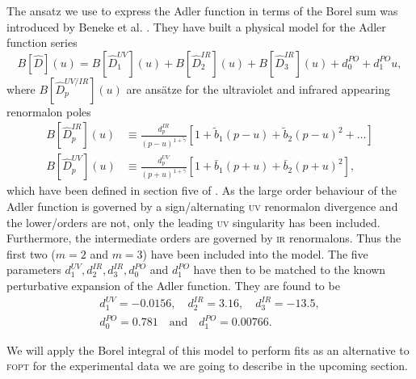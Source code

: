 \documentclass[../../index.tex]{subfiles}
\begin{document}
The ansatz we use to express the Adler function in terms of the Borel sum was
introduced by Beneke et al. \cite{Beneke2008}. They have built a physical model
for the Adler function series
\begin{equation}
  \label{eq:borelModel}
  B[\widehat D](u) = B[\widehat D_1^{UV}](u) + B[\widehat D_2^{IR}](u) + B[\widehat D_3^{IR}](u) + d_0^{PO} + d_1^{PO}u,
\end{equation}
where \(B[\widehat D_p^{UV/IR}](u)\) are ansätze for the ultraviolet and
infrared appearing renormalon poles
\begin{align}
  B[\widehat D_p^{IR}](u)
  &\equiv \frac{d_p^{IR}}{(p-u)^{1+\tilde \gamma}}
    \left[  1 + \tilde b_1(p-u) + \tilde b_2(p-u)^2 + \dots \right] \\
  B[\widehat D_p^{UV}](u) &\equiv \frac{d_p^{UV}}{(p+u)^{1+\bar\gamma}}\left[1 + \bar b_1(p+u) + \bar b_2(p+u)^2 \right],
\end{align}
which have been defined in section five of \cite{Beneke2008}. As the large order
behaviour of the Adler function is governed by a sign\-/alternating \textsc{uv}
renormalon divergence and the lower\-/orders are not, only the leading
\textsc{uv} singularity has been included. Furthermore, the intermediate orders
are governed by \textsc{ir} renormalons. Thus the first two (\(m=2\) and
\(m=3\)) have been included into the model. The five parameters \(d_1^{UV},
d_2^{IR}, d_3^{IR}, d_0^{PO}\) and \(d_1^{PO}\) have then to be matched to the
known perturbative expansion of the Adler function. They are found to be
\cite{Beneke2008}
\begin{equation}
  \begin{split}
    d_1^{UV} = -0.0156, \quad d_2^{IR} = 3.16, \quad d_3^{IR} = -13.5, \\
    d_0^{PO} = 0.781 \quad \text{and} \quad d_1^{PO} = 0.00766.
  \end{split}
\end{equation}

We will apply the Borel integral of this model to perform fits as an
alternative to \textsc{fopt} for the experimental data we are going to describe
in the upcoming section.
\end{document}
